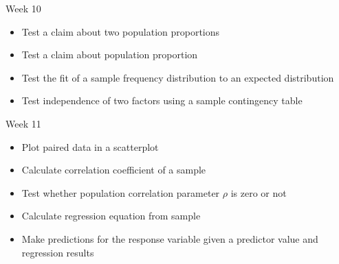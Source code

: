 \documentclass[xcolor=table, aspectratio=169, bigger]{beamer}
\begin{document}
\begin{frame}{Week 10}
\begin{block}{}
\begin{itemize}
\item Test a claim about two population proportions
\item Test a claim about population proportion
\item Test the fit of a sample frequency distribution to an expected distribution
\item Test independence of two factors using a sample contingency table

\end{itemize}
\end{block}
\end{frame}

\begin{frame}{Week 11}
\begin{block}{}
\begin{itemize}
\item Plot paired data in a scatterplot
\item Calculate correlation coefficient of a sample
\item Test whether population correlation parameter $\rho$ is zero or not
\item Calculate regression equation from sample
\item Make predictions for the response variable given a predictor value and regression results
\end{itemize}
\end{block}
\end{frame}
\end{document}
